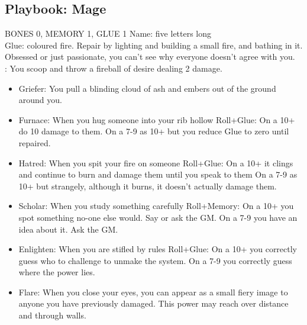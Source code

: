 \subsection{Playbook: Mage}
BONES 0, MEMORY 1, GLUE 1  
Name: five letters long
\\Glue: coloured fire. Repair by lighting and building a small fire, and bathing in it.
Obsessed or just passionate, you can't see why everyone doesn't agree with you.
\\: You scoop and throw a fireball of desire dealing 2 damage.
\begin{itemize}
\item  Griefer: You pull a blinding cloud of ash and embers out of the ground around you.
\item  Furnace: When you hug someone into your rib hollow Roll+Glue:
	\myitem On a 10+ do 10 damage to them.
	\myitemend On a 7-9 as 10+ but you reduce Glue to zero until repaired.
\item  Hatred: When you spit your fire on someone Roll+Glue:
	\myitem On a 10+ it clings and continue to burn and damage them until you speak to them
	\myitemend On a 7-9 as 10+ but strangely, although it burns, it doesn't actually damage them.
\item  Scholar: When you study something carefully Roll+Memory:
	\myitem On a 10+ you spot something no-one else would. Say or ask the GM.
	\myitemend On a  7-9 you have an idea about it. Ask the GM.
\item  Enlighten: When you are stifled by rules Roll+Glue:
	\myitem On a 10+ you correctly guess who to challenge to unmake the system.
	\myitemend On a 7-9 you correctly guess where the power lies.
\item  Flare: When you close your eyes, you can appear as a small fiery image to anyone you have previously damaged. This power may reach over distance and through walls.
\end{itemize}

\newpage
